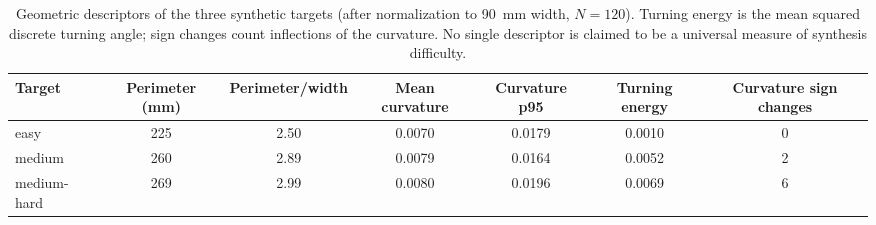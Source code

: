 \begin{table}[H]
\caption{Geometric descriptors of the three synthetic targets (after normalization to 90~mm width, $N=120$). Turning energy is the mean squared discrete turning angle; sign changes count inflections of the curvature. No single descriptor is claimed to be a universal measure of synthesis difficulty.}
\label{tab:target_complexity}
\centering
\begin{tabular}{@{}lcccccc@{}}
\hline
Target & Perimeter (mm) & Perimeter/width & Mean curvature & Curvature p95 & Turning energy & Curvature sign changes \\
\hline
easy & 225 & 2.50 & 0.0070 & 0.0179 & 0.0010 & 0 \\
medium & 260 & 2.89 & 0.0079 & 0.0164 & 0.0052 & 2 \\
medium-hard & 269 & 2.99 & 0.0080 & 0.0196 & 0.0069 & 6 \\
\hline
\end{tabular}
\end{table}